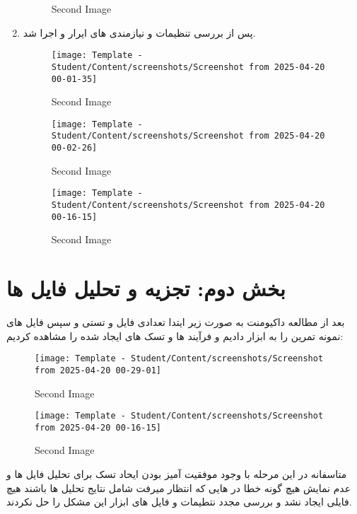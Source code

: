 \begin{enumerate}
\begin{figure}[htbp]
      \caption{Second Image}
      \label{fig:vert2}
\end{figure}
\item پس از بررسی تنظیمات و نیازمندی های  ایرار  و اجرا شد.
\begin{figure}[htbp]
      \centering
      \texttt{[image: Template - Student/Content/screenshots/Screenshot from 2025-04-20 00-01-35]}
      \caption{Second Image}
      \label{fig:vert2}
\end{figure}
\begin{figure}[htbp]
      \centering
      \texttt{[image: Template - Student/Content/screenshots/Screenshot from 2025-04-20 00-02-26]}
      \caption{Second Image}
      \label{fig:vert2}
\end{figure}
\begin{figure}[htbp]
      \centering
      \texttt{[image: Template - Student/Content/screenshots/Screenshot from 2025-04-20 00-16-15]}
      \caption{Second Image}
      \label{fig:vert2}
\end{figure}
\end{enumerate}
\section{بخش دوم: تجزیه و تحلیل فایل ها}
بعد از مطالعه داکیومنت  به صورت زیر ایتدا تعدادی فایل و  تستی و سپس فایل های نمونه تمرین را به ابزار دادیم و فرآیند ها و تسک های ایجاد شده را مشاهده کردیم:
\begin{figure}[htbp]
      \centering
      \texttt{[image: Template - Student/Content/screenshots/Screenshot from 2025-04-20 00-29-01]}
      \caption{Second Image}
      \label{fig:vert2}
\end{figure}
\begin{figure}[htbp]
      \centering
      \texttt{[image: Template - Student/Content/screenshots/Screenshot from 2025-04-20 00-16-15]}
      \caption{Second Image}
      \label{fig:vert2}
\end{figure}
متاسفانه در این مرحله با وجود موفقیت آمیز بودن ایحاد تسک برای تحلیل فایل ها و عدم نمایش هیچ گونه خطا در   هایی که انتظار میرفت شامل نتایج تحلیل ها باشند هیچ فایلی ایجاد نشد و بررسی مجدد نتطیمات و فایل های  ابزار  این مشکل را حل نکردند.